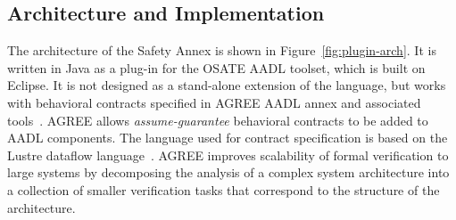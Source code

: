 \subsection{Architecture and Implementation}

The architecture of the Safety Annex is shown in Figure~\ref{fig:plugin-arch}.  It is written in Java as a plug-in for the OSATE AADL toolset, which is built on Eclipse.  It is not designed as a stand-alone extension of the language, but works with behavioral contracts specified in AGREE AADL annex and associated tools~\cite{NFM2012:CoGaMiWhLaLu}.  AGREE allows {\em assume-guarantee} behavioral contracts to be added to AADL components.  The language used for contract specification is based on the Lustre dataflow language~\cite{Halbwachs91:IEEE}. AGREE improves scalability of formal verification to large systems by decomposing the analysis of a complex system architecture into a collection of smaller verification tasks that correspond to the structure of the architecture.

